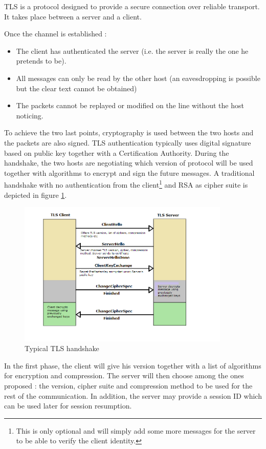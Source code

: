 TLS is a protocol designed to provide a secure connection over reliable transport. It takes place between a server and a client. 

Once the channel is established :

\begin{itemize}
\item The client has authenticated the server (i.e. the server is really the one he pretends to be).
\item All messages can only be read by the other host (an eavesdropping is possible but the clear text cannot be obtained)
\item The packets cannot be replayed or modified on the line without the host noticing.
\end{itemize}

To achieve the two last points, cryptography is used between the two hosts and the packets are also signed. TLS authentication typically uses digital signature based on public key together with a Certification Authority. During the handshake, the two hosts are negotiating which version of protocol will be used together with algorithms to encrypt and sign the future messages. A traditional handshake with no authentication from the client\footnote{This is only optional and will simply add some more messages for the server to be able to verify the client identity.} and RSA as cipher suite is depicted in figure \ref{fig:tls_handshake}.


\begin{figure}[!ht]
\centering
\includegraphics[width=0.9\textwidth]{images/tls-handshake.png}
\caption{Typical TLS handshake}
\label{fig:tls_handshake}
\end{figure}

In the first phase, the client will give his version together with a list of algorithms for encryption and compression. The server will then choose among the ones proposed : the version, cipher suite and compression method to be used for the rest of the communication. In addition, the server may provide a session ID which can be used later for session resumption.

